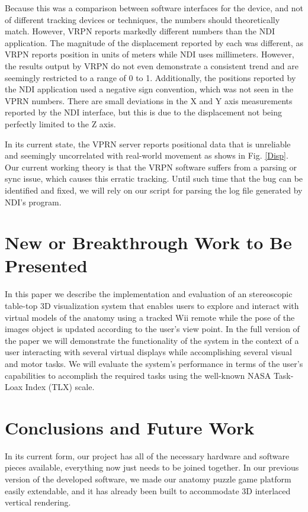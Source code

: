 \documentclass[]{spie}  %
\begin{document}
Because this was a comparison between software interfaces for the device, and not of different tracking devices or techniques, the numbers should theoretically match. However, VRPN reports markedly different numbers than the NDI application. The magnitude of the displacement reported by each was different, as VRPN reports position in units of meters while NDI uses millimeters. However, the results output by VRPN do not even demonstrate a consistent trend and are seemingly restricted to a range of 0 to 1.  Additionally, the positions reported by the NDI application used a negative sign convention, which was not seen in the VPRN numbers. There are small deviations in the X and Y axis measurements reported by the NDI interface, but this is due to the displacement not being perfectly limited to the Z axis.

In its current state, the VPRN server reports positional data that is unreliable and seemingly uncorrelated with real-world movement as shows in Fig. \ref{Disp}. Our current working theory is that the VRPN software suffers from a parsing or sync issue, which causes this erratic tracking. Until such time that the bug can be identified and fixed, we will rely on our script for parsing the log file generated by NDI’s program.

\section{New or Breakthrough Work to Be Presented}
In this paper we describe the implementation and evaluation of an stereoscopic table-top 3D visualization system that enables users to explore and interact with virtual models of the anatomy using a tracked Wii remote while the pose of the images object is updated according to the user's view point. In the full version of the paper we will demonstrate the functionality of the system in the context of a user interacting with several virtual displays while accomplishing several visual and motor tasks. We will evaluate the system's performance in terms of the user's capabilities to accomplish the required tasks using the well-known NASA Task-Loax Index (TLX) scale.

\section{Conclusions and Future Work}
In its current form, our project has all of the necessary hardware and software pieces available, everything now just needs to be joined together. In our previous version of the developed software, we made our anatomy puzzle game platform easily extendable, and it has already been built to accommodate 3D interlaced vertical rendering. 
\end{document}
